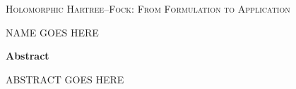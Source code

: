 \thispagestyle{plain}
\begin{center}
\textsc{\Large Holomorphic Hartree--Fock: From Formulation to Application}

    \vspace{0.2cm}
    \normalsize{{\textsc{NAME GOES HERE}}}
    
\vspace{0.2cm}
    \normalsize{\textbf{Abstract}}
\end{center}
ABSTRACT GOES HERE
